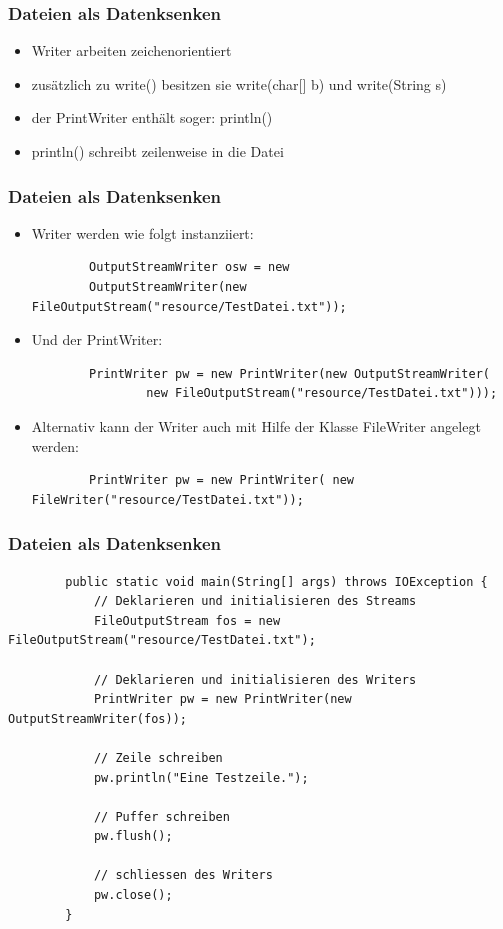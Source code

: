 \begin{frame}[fragile]
\frametitle{Dateien als Datenksenken}
	\begin{itemize}
	  \item Writer arbeiten zeichenorientiert
	  \item zusätzlich zu write() besitzen sie write(char[] b) und write(String s)
	  \item der PrintWriter enthält soger: println()
	  \item println() schreibt zeilenweise in die Datei
	\end{itemize}
\end{frame}

\begin{frame}[fragile]
\frametitle{Dateien als Datenksenken}
	\begin{itemize}
	  \item Writer werden wie folgt instanziiert:\\
	  \begin{lstlisting}
	  	OutputStreamWriter osw = new
	  	OutputStreamWriter(new FileOutputStream("resource/TestDatei.txt"));
	  \end{lstlisting}
	  \item Und der PrintWriter:
	  \begin{lstlisting}
	  	PrintWriter pw = new PrintWriter(new OutputStreamWriter(
				new FileOutputStream("resource/TestDatei.txt")));
	  \end{lstlisting}
	  \item  Alternativ kann der Writer auch mit Hilfe der Klasse FileWriter
	  angelegt werden:
	  \begin{lstlisting}
		PrintWriter pw = new PrintWriter( new FileWriter("resource/TestDatei.txt"));
	  \end{lstlisting}
	\end{itemize}
\end{frame}

\begin{frame}[fragile]
\frametitle{Dateien als Datenksenken}
	\begin{lstlisting}
		public static void main(String[] args) throws IOException {
			// Deklarieren und initialisieren des Streams
			FileOutputStream fos = new FileOutputStream("resource/TestDatei.txt");
	
			// Deklarieren und initialisieren des Writers
			PrintWriter pw = new PrintWriter(new OutputStreamWriter(fos));
	
			// Zeile schreiben
			pw.println("Eine Testzeile.");
	
			// Puffer schreiben
			pw.flush();
	
			// schliessen des Writers
			pw.close();
		}
	\end{lstlisting}
\end{frame}

